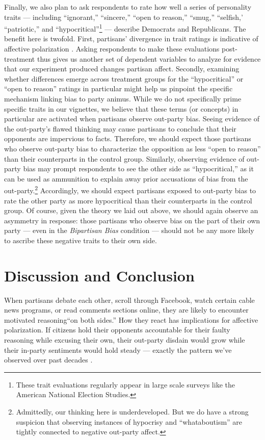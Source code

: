 \documentclass[12pt, letterpaper]{article}
\begin{document}
Finally, we also plan to ask respondents to rate how well a series of personality traits --- including ``ignorant,'' ``sincere,'' ``open to reason,'' ``smug,'' ``selfish,' ``patriotic,'' and ``hypocritical''\footnote{These trait evaluations regularly appear in large scale surveys like the American National Election Studies.} --- describe Democrats and Republicans. The benefit here is twofold. First, partisans' divergence in trait ratings is indicative of affective polarization \citep{hetheringtonlongrudolph_2016}. Asking respondents to make these evaluations post-treatment thus gives us another set of dependent variables to analyze for evidence that our experiment produced changes partisan affect. Secondly, examining whether differences emerge across treatment groups for the ``hypocritical'' or ``open to reason'' ratings in particular might help us pinpoint the specific mechanism linking bias to party animus. While we do not specifically prime specific traits in our vignettes, we believe that these terms (or concepts) in particular are activated when partisans observe out-party bias. Seeing evidence of the out-party's flawed thinking may cause partisans to conclude that their opponents are impervious to facts. Therefore, we should expect those partisans who observe out-party bias to characterize the opposition as less ``open to reason'' than their counterparts in the control group. Similarly, observing evidence of out-party bias may prompt respondents to see the other side as ``hypocritical,'' as it can be used as ammunition to explain away prior accusations of bias from the out-party.\footnote{Admittedly, our thinking here is underdeveloped. But we do have a strong suspicion that observing instances of hypocrisy and ``whataboutism'' are tightly connected to negative out-party affect.} Accordingly, we should expect partisans exposed to out-party bias to rate the other party as more hypocritical than their counterparts in the control group. Of course, given the theory we laid out above, we should again observe an asymmetry in response: those partisans who observe bias on the part of their own party --- even in the \textit{Bipartisan Bias} condition --- should not be any more likely to ascribe these negative traits to their own side. 

\section*{Discussion and Conclusion}

When partisans debate each other, scroll through Facebook, watch certain cable news programs, or read comments sections online, they are likely to encounter motivated reasoning``on both sides.'' How they react has implications for affective polarization. If citizens hold their opponents accountable for their faulty reasoning while excusing their own, their out-party disdain would grow while their in-party sentiments would hold steady --- exactly the pattern we've observed over past decades \citep{IyengarSoodLelkes2012}. 
\end{document}
